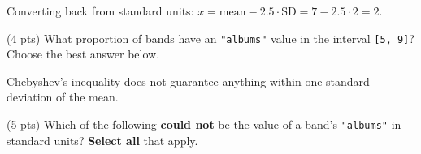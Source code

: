 \documentclass[twoside,12pt]{article}
\begin{document}
\begin{probset}
\begin{prob}[(17 pts)]
\begin{subprobset}
\begin{subprob}
\smallskip
\begin{center}
\end{center}

\begin{soln}
Converting back from standard units: $x = \text{mean} - 2.5 \cdot \text{SD} = 7 - 2.5 \cdot 2 = 2$.
\end{soln}

\end{subprob}

\bigskip

\begin{subprob}(4 pts)
What proportion of bands have an \texttt{"albums"} value in the interval \texttt{[5, 9]}? Choose the best answer below.

\medskip


\smallskip


\smallskip


\smallskip


\smallskip


\begin{soln}
Chebyshev's inequality does not guarantee anything within one standard deviation of the mean.
\end{soln}

\end{subprob}

\bigskip

\begin{subprob}(5 pts)
Which of the following \textbf{could not} be the value of a band's \texttt{"albums"} in standard units? \textbf{Select all} that apply.

\medskip


\smallskip


\smallskip


\smallskip


\smallskip


\end{subprob}
\end{subprobset}
\end{prob}
\end{probset}
\end{document}
